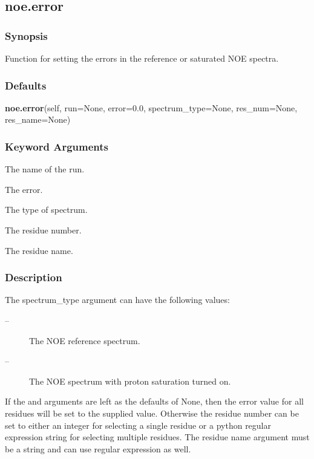 \newpage

\subsection{noe.error}


\subsubsection{Synopsis}

Function for setting the errors in the reference or saturated NOE spectra.



\subsubsection{Defaults}

\textsf{\textbf{noe.error}(self, run=None, error=0.0, spectrum\_type=None, res\_num=None, res\_name=None)}


\subsubsection{Keyword Arguments}

  The name of the run. 

  The error. 

  The type of spectrum. 

  The residue number. 

  The residue name. 




\subsubsection{Description}

The spectrum\_type argument can have the following values:


\begin{description}
\item[ --]  The NOE reference spectrum. 
\item[ --]  The NOE spectrum with proton saturation turned on. 
\end{description}


If the  and  arguments are left as the defaults of None, then the error value for all residues will be set to the supplied value.  Otherwise the residue number can be set to either an integer for selecting a single residue or a python regular expression string for selecting multiple residues.  The residue name argument must be a string and can use regular expression as well.





